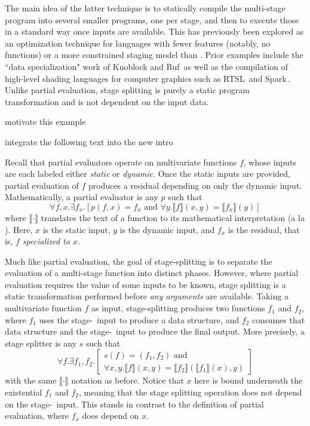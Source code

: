 The main idea of the latter technique is to statically compile the multi-stage program into several smaller programs, one per stage, and then to execute those in a standard way once inputs are available.  This has previously been explored as an optimization technique for languages with fewer features (notably, no functions) or a more constrained staging model than \lang. Prior examples include the ``data specialization" work of Knoblock and Ruf\,\cite{knoblock96} as well as the compilation of high-level shading languages for computer graphics such as RTSL\,\cite{Proudfoot:2001} and Spark\,\cite{Foley:2011}.  Unlike partial evaluation, stage splitting is purely a static program transformation and is not dependent on the input data.

\TODO motivate this example

\TODO integrate the following text into the new intro

Recall that partial evaluators operate on multivariate functions $f$, whose
inputs are each labeled either {\em static} or {\em dynamic}. Once the static
inputs are provided, partial evaluation of $f$ produces a residual depending on
only the dynamic input. Mathematically, a partial evaluator is any $p$ such
that
\[
	\forall f,x. \exists f_x. \left[p(f,x) = f_x \text{ and } \forall y.\llbracket f \rrbracket(x,y)=\llbracket f_x \rrbracket(y)\right]
\]
where $\llbracket \cdot \rrbracket$ translates the text of a function to its
mathematical interpretation (a la \cite{jones96}). Here, $x$ is the static
input, $y$ is the dynamic input, and $f_x$ is the residual, that is, \emph{$f$
specialized to $x$}.


Much like partial evaluation, the goal of stage-splitting is to separate the evaluation of a multi-stage function into distinct phases.
However, where partial evaluation requires the value of some inputs to be known, stage splitting is a static transformation performed
before {\em any arguments} are available.
Taking a multivariate function $f$ as input, stage-splitting produces two functions $f_1$ and $f_2$,
where $f_1$ uses the stage-\bbone\ input to produce a data structure, 
and $f_2$ consumes that data structure and the stage-\bbtwo\ input to produce the final output.  
More precisely, a stage splitter is any $s$ such that
\[
	\forall f. \exists f_1,f_2. 
	\left[
		\begin{array}{l}
		s(f) = (f_1,f_2) \text{ and } \\
		\forall x,y.\llbracket f \rrbracket(x,y)=\llbracket f_2 \rrbracket(\llbracket f_1 \rrbracket(x),y)
		\end{array}
	\right]
\]
with the same $\llbracket \cdot \rrbracket$ notation as before.
Notice that $x$ here is bound underneath the existential $f_1$ and $f_2$,
meaning that the stage splitting operation does not depend on the stage-\bbone\ input.
This stands in contrast to the definition of partial evaluation, where $f_x$ does depend on $x$.




